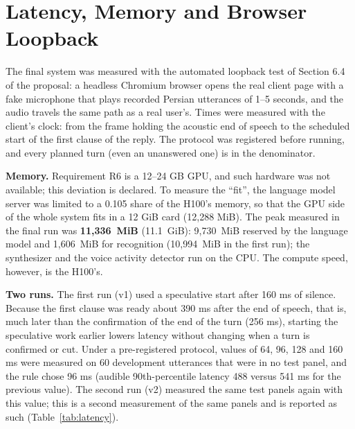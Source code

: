 \section{Latency, Memory and Browser Loopback}
\label{sec:res-latency}

The final system was measured with the automated loopback test of Section 6.4 of the
proposal: a headless Chromium browser opens the real client page with a fake microphone that
plays recorded Persian utterances of 1--5 seconds, and the audio travels the same path as a
real user's. Times were measured with the client's clock: from the frame holding the acoustic
end of speech to the scheduled start of the first clause of the reply. The protocol was
registered before running, and every planned turn (even an unanswered one) is in the
denominator.

\textbf{Memory.} Requirement R6 is a 12--24 GB GPU, and such hardware was not available; this
deviation is declared. To measure the ``fit'', the language model server was limited to a
0.105 share of the H100's memory, so that the GPU side of the whole system fits in a 12 GiB
card (12,288 MiB). The peak measured in the final run was \textbf{11,336~MiB} (11.1~GiB):
9,730~MiB reserved by the language model and 1,606~MiB for recognition (10,994~MiB in the first
run); the synthesizer and the voice activity detector run on the CPU. The compute speed,
however, is the H100's.

\textbf{Two runs.} The first run (v1) used a speculative start after 160 ms of silence. Because
the first clause was ready about 390 ms after the end of speech, that is, much later than the
confirmation of the end of the turn (256 ms), starting the speculative work earlier lowers
latency without changing when a turn is confirmed or cut. Under a pre-registered protocol,
values of 64, 96, 128 and 160 ms were measured on 60 development utterances that were in no
test panel, and the rule chose 96 ms (audible 90th-percentile latency 488 versus 541 ms for
the previous value). The second run (v2) measured the same test panels again with this value;
this is a second measurement of the same panels and is reported as such
(Table~\ref{tab:latency}).

